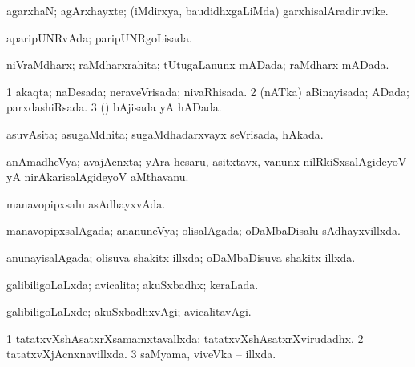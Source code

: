 {{\bentry
{} 
\gl{\nA}
\expl{}
\bmng
agarxhaN; agArxhayxte; (iMdirxya, baudidhxgaLiMda) garxhisalAradiruvike. 
\emng
\eentry

\bentry
{} 
\gl{\gu}
\expl{}
\bmng
aparipUNRvAda; paripUNRgoLisada. 
\emng
\eentry

\bentry
{} 
\gl{\gu}
\expl{}
\bmng
niVraMdharx; raMdharxrahita; tUtugaLanunx mADada; raMdharx mADada. 
\emng
\eentry

\bentry
{} 
\gl{\gu}
\expl{}
\bmng
\bnum
\num{1} akaqta; naDesada; neraveVrisada; nivaRhisada. 
\num{2} (nATka) aBinayisada; ADada; parxdashiRsada. 
\num{3} (\saM) bAjisada yA hADada. 
\enum
\emng
\eentry

\bentry
{} 
\gl{\gu}
\expl{}
\bmng
asuvAsita; asugaMdhita; sugaMdhadarxvayx seVrisada, hAkada. 
\emng
\eentry

\bentry
{} 
\gl{\nA}
\expl{}
\bmng
anAmadheVya; avajAcnxta; yAra hesaru, asitxtavx, \mo vanunx nilRkiSxsalAgideyoV yA nirAkarisalAgideyoV aMthavanu. 
\emng
\eentry

\bentry
{} 
\gl{\gu}
\expl{}
\bmng
manavopipxsalu asAdhayxvAda. 
\emng
\eentry

\bentry
{} 
\gl{\gu}
\expl{}
\bmng
manavopipxsalAgada; ananuneVya; olisalAgada; oDaMbaDisalu sAdhayxvillxda. 
\emng
\eentry

\bentry
{} 
\gl{\gu}
\expl{}
\bmng
anunayisalAgada; olisuva shakitx illxda; oDaMbaDisuva shakitx illxda. 
\emng
\eentry

\bentry
{} 
\gl{\gu}
\expl{}
\bmng
galibiligoLaLxda; avicalita; akuSxbadhx; keraLada. 
\emng
\eentry

\bentry
{} 
\gl{\kirxvi}
\expl{}
\bmng
galibiligoLaLxde; akuSxbadhxvAgi; avicalitavAgi. 
\emng
\eentry

\bentry
{} 
\gl{\gu}
\expl{}
\bmng
{} 
\emng
\eentry

\bentry
{} 
\gl{\gu}
\expl{}
\bmng
\bnum
\num{1} tatatxvXshAsatxrXsamamxtavallxda; tatatxvXshAsatxrXvirudadhx. 
\num{2} tatatxvXjAcnxnavillxda. 
\num{3} saMyama, viveVka -- illxda. 
\enum
\emng
\eentry

}}

